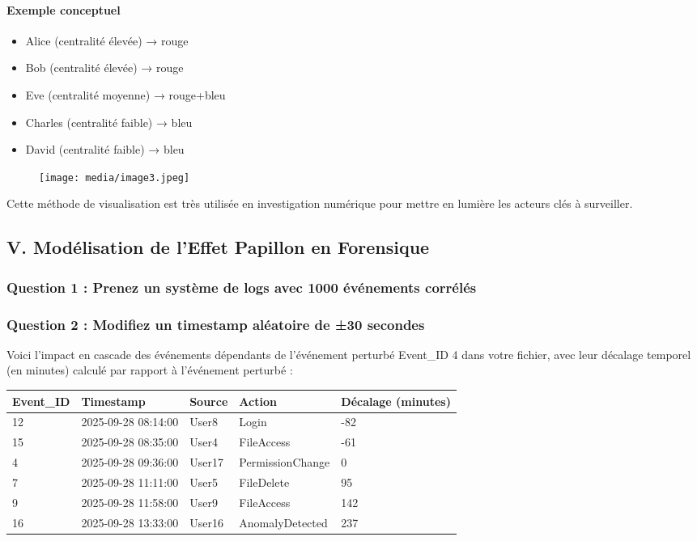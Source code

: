 \documentclass[12pt, a4paper]{article}
\begin{document}
		\paragraph{Exemple conceptuel}
		\begin{itemize}
		\item Alice (centralité élevée) → rouge
		\item Bob (centralité élevée) → rouge
		\item Eve (centralité moyenne) → rouge+bleu
		\item Charles (centralité faible) → bleu
		\item David (centralité faible) → bleu
		\end{itemize}
		
		\begin{figure}[H]
		\centering
		\texttt{[image: media/image3.jpeg]}
		\end{figure}
		
		Cette méthode de visualisation est très utilisée en investigation numérique pour mettre en lumière les acteurs clés à surveiller.
		
		\subsection*{V. Modélisation de l'Effet Papillon en Forensique}
		
		\subsubsection*{Question 1 : Prenez un système de logs avec 1000 événements corrélés}
		
		\subsubsection*{Question 2 : Modifiez un timestamp aléatoire de ±30 secondes}
		
		Voici l'impact en cascade des événements dépendants de l'événement perturbé Event\_ID 4 dans votre fichier, avec leur décalage temporel (en minutes) calculé par rapport à l'événement perturbé :
		
		\begin{table}[H]
		\centering
		\begin{tabular}{|p{2cm}|p{3cm}|p{2.5cm}|p{3cm}|p{3cm}|}
			\hline
			\textbf{Event\_ID} & \textbf{Timestamp} & \textbf{Source} & \textbf{Action} & \textbf{Décalage (minutes)} \\
			\hline
			12 & 2025-09-28 08:14:00 & User8 & Login & -82 \\
			\hline
			15 & 2025-09-28 08:35:00 & User4 & FileAccess & -61 \\
			\hline
			4 & 2025-09-28 09:36:00 & User17 & PermissionChange & 0 \\
			\hline
			7 & 2025-09-28 11:11:00 & User5 & FileDelete & 95 \\
			\hline
			9 & 2025-09-28 11:58:00 & User9 & FileAccess & 142 \\
			\hline
			16 & 2025-09-28 13:33:00 & User16 & AnomalyDetected & 237 \\
			\hline
		\end{tabular}
		\end{table}
\end{document}
